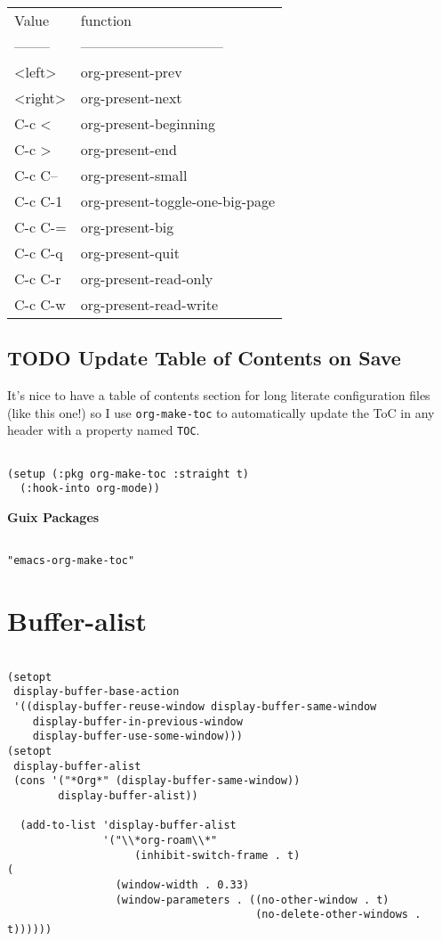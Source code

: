 \documentclass[11pt]{article}
\begin{document}
\begin{center}
\begin{tabular}{ll}
Value & function\\[0pt]
-------- & ------------------------------\\[0pt]
<left> & org-present-prev\\[0pt]
<right> & org-present-next\\[0pt]
C-c   < & org-present-beginning\\[0pt]
C-c   > & org-present-end\\[0pt]
C-c   C-- & org-present-small\\[0pt]
C-c   C-1 & org-present-toggle-one-big-page\\[0pt]
C-c   C-= & org-present-big\\[0pt]
C-c   C-q & org-present-quit\\[0pt]
C-c   C-r & org-present-read-only\\[0pt]
C-c   C-w & org-present-read-write\\[0pt]
\end{tabular}
\end{center}
\subsection{{\bfseries\sffamily TODO} Update Table of Contents on Save}
\label{sec:org5f526d4}

It's nice to have a table of contents section for long literate configuration files (like this one!) so I use \texttt{org-make-toc} to automatically update the ToC in any header with a property named \texttt{TOC}.

\begin{verbatim}

(setup (:pkg org-make-toc :straight t)
  (:hook-into org-mode))

\end{verbatim}

\textbf{Guix Packages}

\begin{verbatim}

"emacs-org-make-toc"

\end{verbatim}
\section{Buffer-alist}
\label{sec:org9b9058f}
\begin{verbatim}

(setopt
 display-buffer-base-action
 '((display-buffer-reuse-window display-buffer-same-window
    display-buffer-in-previous-window
    display-buffer-use-some-window)))
(setopt
 display-buffer-alist
 (cons '("*Org*" (display-buffer-same-window))
        display-buffer-alist))

  (add-to-list 'display-buffer-alist
               '("\\*org-roam\\*"
                    (inhibit-switch-frame . t)
(
                 (window-width . 0.33)
                 (window-parameters . ((no-other-window . t)
                                       (no-delete-other-windows . t))))))
\end{verbatim}
\end{document}
